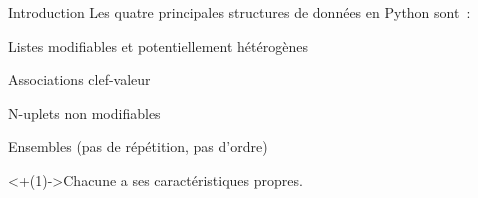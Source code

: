 \begin{frame}{Introduction}
  Les quatre principales structures de données en Python sont~:

  \begin{description}[<+(1)->]
    \item[\texttt{list}] Listes modifiables et potentiellement hétérogènes
    \item[\texttt{dict}] Associations clef-valeur
    \item[\texttt{tuple}] N-uplets non modifiables
    \item[\texttt{set}] Ensembles (pas de répétition, pas d'ordre)
  \end{description}

  \onslide<+(1)->{Chacune a ses caractéristiques propres.}
\end{frame}
